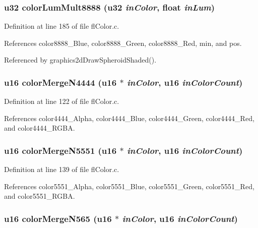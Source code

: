 \subsubsection{\setlength{\rightskip}{0pt plus 5cm}u32 color\-Lum\-Mult8888 (u32 {\em in\-Color}, float {\em in\-Lum})}\label{flColor_8h_eabbaad667dc71427eb83782d1588762}




Definition at line 185 of file fl\-Color.c.

References color8888\_\-Blue, color8888\_\-Green, color8888\_\-Red, min, and pos.

Referenced by graphics2d\-Draw\-Spheroid\-Shaded().
\subsubsection{\setlength{\rightskip}{0pt plus 5cm}u16 color\-Merge\-N4444 (u16 $\ast$ {\em in\-Color}, u16 {\em in\-Color\-Count})}\label{flColor_8h_9061458880496c59dbb038847f691c21}




Definition at line 122 of file fl\-Color.c.

References color4444\_\-Alpha, color4444\_\-Blue, color4444\_\-Green, color4444\_\-Red, and color4444\_\-RGBA.
\subsubsection{\setlength{\rightskip}{0pt plus 5cm}u16 color\-Merge\-N5551 (u16 $\ast$ {\em in\-Color}, u16 {\em in\-Color\-Count})}\label{flColor_8h_bb41f344d97f285f6e39ae0e931e3b80}




Definition at line 139 of file fl\-Color.c.

References color5551\_\-Alpha, color5551\_\-Blue, color5551\_\-Green, color5551\_\-Red, and color5551\_\-RGBA.
\subsubsection{\setlength{\rightskip}{0pt plus 5cm}u16 color\-Merge\-N565 (u16 $\ast$ {\em in\-Color}, u16 {\em in\-Color\-Count})}\label{flColor_8h_7aa019d179d856b74f3c50b1bd0187a5}




